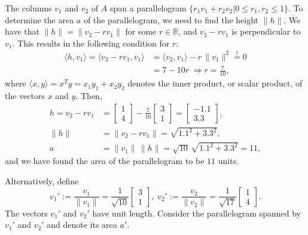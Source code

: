 \documentclass[10pt]{article}
\newcommand{\R}{\mathds{R}}
\begin{document}
The columns $v_1$ and $v_2$ of $A$ span a parallelogram $\{r_1 v_1 + r_2
v_2 | 0\le r_{1}, r_2\le 1\}$.  To determine the area $a$ of the
parallelogram, we need to find the height $\| h\|$. We have that $\| h\| = \| v_2-r v_1\|$
for some $r\in\R$, and $v_2-r v_1$ is perpendicular to $v_1$. This results in the following condition for $r$:
\begin{align*}
\langle h, v_1\rangle=\langle v_2- r v_1, v_1\rangle &= \langle v_2, v_1\rangle - r\, \|v_1\|^2 \stackrel{!}{=} 0\\
 &= 7 - 10r \; \Longrightarrow r=\frac{7}{10},
\end{align*}
where $\langle x, y\rangle = x^T y = x_1y_1 + x_2y_2$ denotes the inner product, or scalar product, of the vectors $x$ and $y$. Then,
\begin{align*}
h=v_2 - r v_1 &= \left[\begin{array}{c} 1\\ 4 \end{array}\right] - \frac{7}{10} \left[\begin{array}{c} 3\\ 1 \end{array}\right] = \left[\begin{array}{c} -1.1\\ 3.3 \end{array}\right],\\
\| h\| &= \| v_2 - r v_1\| = \sqrt{1.1^2 + 3.3^2},\\
a &= \| v_1\|\, \| h\| = \sqrt{10} \, \sqrt{1.1^2 + 3.3^2} = 11,
\end{align*}
and we have found the area of the parallelogram to be $11$ units.

Alternatively, define
\[
v_1' := \frac{v_1}{\| v_1\|} = \frac{1}{\sqrt{10}} \left[\begin{array}{c} 3\\ 1 \end{array}\right] ,\; v_2' := \frac{v_2}{\| v_2\|} = \frac{1}{\sqrt{17}} \left[\begin{array}{c} 1\\ 4 \end{array}\right].
\]
The vectors $v_1'$ and $v_2'$ have unit length. Consider the parallelogram
spanned by $v_1'$ and $v_2'$ and denote its area $a'$.
\end{document}
